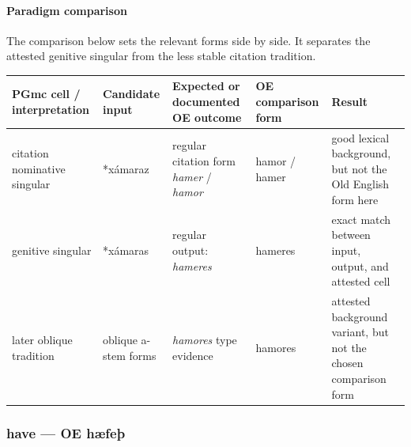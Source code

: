 \documentclass[
  british,
  a4paper,
]{article}
\newcounter{none} %
\begin{document}
\paragraph{Paradigm comparison}\label{paradigm-comparison-6}

The comparison below sets the relevant forms side by side. It separates
the attested genitive singular from the less stable citation tradition.

{\def\LTcaptype{none} %
\begin{longtable}[]{@{}
  >{\raggedright\arraybackslash}p{}
  >{\raggedright\arraybackslash}p{}
  >{\raggedright\arraybackslash}p{}
  >{\raggedright\arraybackslash}p{}
  >{\raggedright\arraybackslash}p{}@{}}
\toprule\noalign{}
\begin{minipage}[b]{\linewidth}\raggedright
PGmc cell / interpretation
\end{minipage} & \begin{minipage}[b]{\linewidth}\raggedright
Candidate input
\end{minipage} & \begin{minipage}[b]{\linewidth}\raggedright
Expected or documented OE outcome
\end{minipage} & \begin{minipage}[b]{\linewidth}\raggedright
OE comparison form
\end{minipage} & \begin{minipage}[b]{\linewidth}\raggedright
Result
\end{minipage} \\
\midrule\noalign{}
\endhead
\bottomrule\noalign{}
\endlastfoot
citation nominative singular & *xámaraz & regular citation form
\emph{hamer} / \emph{hamor} & hamor / hamer & good lexical background,
but not the Old English form here \\
genitive singular & *xámaras & regular output: \emph{hameres} & hameres
& exact match between input, output, and attested cell \\
later oblique tradition & oblique a-stem forms & \emph{hamores} type
evidence & hamores & attested background variant, but not the chosen
comparison form \\
\end{longtable}
}

\subsubsection{have --- OE hæfeþ}\label{have-oe-huxe6feuxfe}
\end{document}
